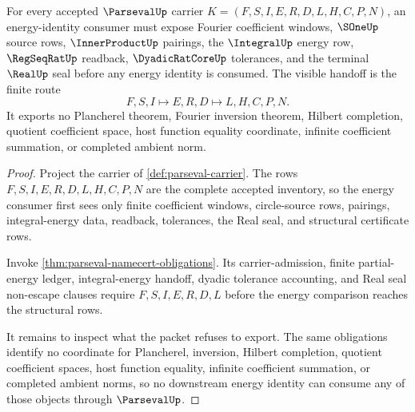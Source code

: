 \begin{theorem}
\label{thm:parseval-integral-energy-handoff-obligation}
For every accepted $\ParsevalUp$ carrier $K=(F,S,I,E,R,D,L,H,C,P,N)$, an energy-identity consumer must expose Fourier coefficient windows, $\SOneUp$ source rows, $\InnerProductUp$ pairings, the $\IntegralUp$ energy row, $\RegSeqRatUp$ readback, $\DyadicRatCoreUp$ tolerances, and the terminal $\RealUp$ seal before any energy identity is consumed. The visible handoff is the finite route
$$
F,S,I \longmapsto E,R,D \longmapsto L,H,C,P,N .
$$
It exports no Plancherel theorem, Fourier inversion theorem, Hilbert completion, quotient coefficient space, host function equality coordinate, infinite coefficient summation, or completed ambient norm.
\end{theorem}
\begin{proof}
Project the carrier of \autoref{def:parseval-carrier}. The rows $F,S,I,E,R,D,L,H,C,P,N$ are the complete accepted inventory, so the energy consumer first sees only finite coefficient windows, circle-source rows, pairings, integral-energy data, readback, tolerances, the Real seal, and structural certificate rows.

Invoke \autoref{thm:parseval-namecert-obligations}. Its carrier-admission, finite partial-energy ledger, integral-energy handoff, dyadic tolerance accounting, and Real seal non-escape clauses require $F,S,I,E,R,D,L$ before the energy comparison reaches the structural rows.

It remains to inspect what the packet refuses to export. The same obligations identify no coordinate for Plancherel, inversion, Hilbert completion, quotient coefficient spaces, host function equality, infinite coefficient summation, or completed ambient norms, so no downstream energy identity can consume any of those objects through $\ParsevalUp$.
\end{proof}

